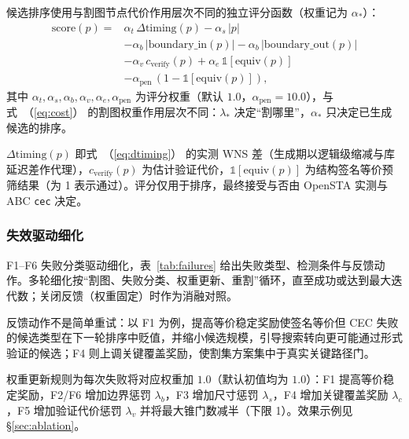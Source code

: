 \documentclass[journal]{IEEEtran}
\renewcommand{\eqref}[1]{\textup{（\ref{#1}）}}
\begin{document}
候选排序使用与割图节点代价作用层次不同的独立评分函数（权重记为 $\alpha_*$）：
{\small
\begin{equation}\label{eq:score}
\begin{split}
\mathrm{score}(p) = {}&\alpha_t\,\Delta\mathrm{timing}(p) - \alpha_s\,|p| \\
&- \alpha_b\,|\mathrm{boundary\_in}(p)| - \alpha_b\,|\mathrm{boundary\_out}(p)| \\
&- \alpha_v\,c_{\mathrm{verify}}(p) + \alpha_e\,\mathbb{1}[\mathrm{equiv}(p)] \\
&- \alpha_{\mathrm{pen}}\,(1-\mathbb{1}[\mathrm{equiv}(p)]),
\end{split}
\end{equation}
}
其中 $\alpha_t,\alpha_s,\alpha_b,\alpha_v,\alpha_e,\alpha_{\mathrm{pen}}$ 为评分权重（默认 $1.0$，$\alpha_{\mathrm{pen}}=10.0$），与式~\eqref{eq:cost} 的割图权重作用层次不同：$\lambda_*$ 决定“割哪里”，$\alpha_*$ 只决定已生成候选的排序。

$\Delta\mathrm{timing}(p)$ 即式~\eqref{eq:dtiming} 的实测 WNS 差（生成期以逻辑级缩减与库延迟差作代理），$c_{\mathrm{verify}}(p)$ 为估计验证代价，$\mathbb{1}[\mathrm{equiv}(p)]$ 为结构签名等价预筛结果（为 1 表示通过）。评分仅用于排序，最终接受与否由 OpenSTA 实测与 ABC \texttt{cec} 决定。

\subsubsection{失效驱动细化}
F1--F6 失败分类驱动细化，表~\ref{tab:failures} 给出失败类型、检测条件与反馈动作。多轮细化按“割图、失败分类、权重更新、重割”循环，直至成功或达到最大迭代数；关闭反馈（权重固定）时作为消融对照。

反馈动作不是简单重试：以 F1 为例，提高等价稳定奖励使签名等价但 CEC 失败的候选类型在下一轮排序中贬值，并缩小候选规模，引导搜索转向更可能通过形式验证的候选；F4 则上调关键覆盖奖励，使割集方案集中于真实关键路径门。

权重更新规则为每次失败将对应权重加 $1.0$（默认初值均为 $1.0$）：F1 提高等价稳定奖励，F2/F6 增加边界惩罚 $\lambda_b$，F3 增加尺寸惩罚 $\lambda_s$，F4 增加关键覆盖奖励 $\lambda_c$，F5 增加验证代价惩罚 $\lambda_v$ 并将最大锥门数减半（下限 1）。效果示例见 \S\ref{sec:ablation}。
\end{document}
